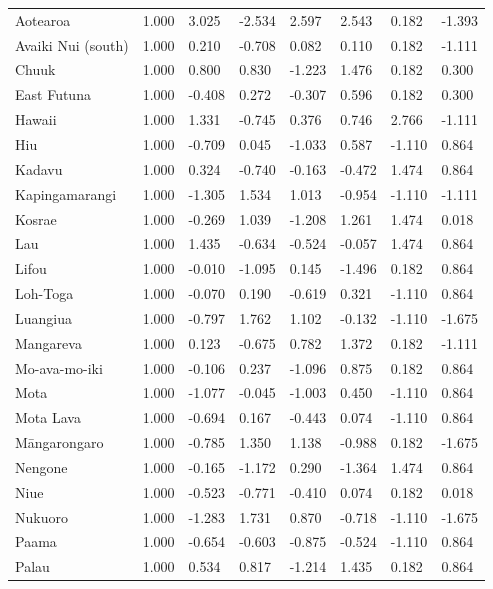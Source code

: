 \begin{longtable}{p{4.5cm}p{1.7cm}p{1.7cm}p{1.7cm}p{1.7cm}p{1.7cm}p{1.7cm}p{1.7cm}}
  Aotearoa & 1.000 & 3.025 & -2.534 & 2.597 & 2.543 & 0.182 & -1.393 \\ 
  Avaiki Nui (south) & 1.000 & 0.210 & -0.708 & 0.082 & 0.110 & 0.182 & -1.111 \\ 
  Chuuk & 1.000 & 0.800 & 0.830 & -1.223 & 1.476 & 0.182 & 0.300 \\ 
  East Futuna & 1.000 & -0.408 & 0.272 & -0.307 & 0.596 & 0.182 & 0.300 \\ 
  Hawaii & 1.000 & 1.331 & -0.745 & 0.376 & 0.746 & 2.766 & -1.111 \\ 
  Hiu & 1.000 & -0.709 & 0.045 & -1.033 & 0.587 & -1.110 & 0.864 \\ 
  Kadavu & 1.000 & 0.324 & -0.740 & -0.163 & -0.472 & 1.474 & 0.864 \\ 
  Kapingamarangi & 1.000 & -1.305 & 1.534 & 1.013 & -0.954 & -1.110 & -1.111 \\ 
  Kosrae & 1.000 & -0.269 & 1.039 & -1.208 & 1.261 & 1.474 & 0.018 \\ 
  Lau & 1.000 & 1.435 & -0.634 & -0.524 & -0.057 & 1.474 & 0.864 \\ 
  Lifou & 1.000 & -0.010 & -1.095 & 0.145 & -1.496 & 0.182 & 0.864 \\ 
  Loh-Toga & 1.000 & -0.070 & 0.190 & -0.619 & 0.321 & -1.110 & 0.864 \\ 
  Luangiua & 1.000 & -0.797 & 1.762 & 1.102 & -0.132 & -1.110 & -1.675 \\ 
  Mangareva & 1.000 & 0.123 & -0.675 & 0.782 & 1.372 & 0.182 & -1.111 \\ 
  Mo-ava-mo-iki & 1.000 & -0.106 & 0.237 & -1.096 & 0.875 & 0.182 & 0.864 \\ 
  Mota & 1.000 & -1.077 & -0.045 & -1.003 & 0.450 & -1.110 & 0.864 \\ 
  Mota Lava & 1.000 & -0.694 & 0.167 & -0.443 & 0.074 & -1.110 & 0.864 \\ 
  Māngarongaro & 1.000 & -0.785 & 1.350 & 1.138 & -0.988 & 0.182 & -1.675 \\ 
  Nengone & 1.000 & -0.165 & -1.172 & 0.290 & -1.364 & 1.474 & 0.864 \\ 
  Niue & 1.000 & -0.523 & -0.771 & -0.410 & 0.074 & 0.182 & 0.018 \\ 
  Nukuoro & 1.000 & -1.283 & 1.731 & 0.870 & -0.718 & -1.110 & -1.675 \\ 
  Paama & 1.000 & -0.654 & -0.603 & -0.875 & -0.524 & -1.110 & 0.864 \\ 
  Palau & 1.000 & 0.534 & 0.817 & -1.214 & 1.435 & 0.182 & 0.864 \\ 

\end{longtable}
